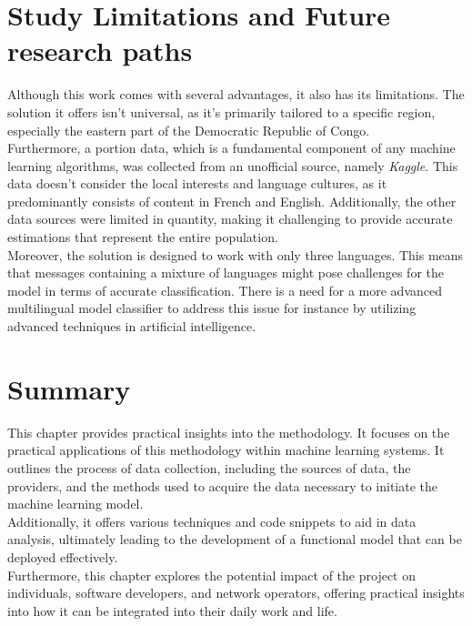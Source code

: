 \documentclass[12pt,a4paper, oneside]{book}
\begin{document}
\section{Study Limitations and Future research paths} 
Although this work comes with several advantages, it also has its limitations. The solution it offers isn't universal, as it's primarily tailored to a specific region, especially the eastern part of the Democratic Republic of Congo.\\

Furthermore, a portion data, which is a fundamental component of any machine learning algorithms, was collected from an unofficial source, namely \textit{Kaggle}. This data doesn't consider the local interests and language cultures, as it predominantly consists of content in French and English. Additionally, the other data sources were limited in quantity, making it challenging to provide accurate estimations that represent the entire population.\\

Moreover, the solution is designed to work with only three languages. This means that messages containing a mixture of languages might pose challenges for the model in terms of accurate classification. There is a need for a more advanced multilingual model classifier to address this issue for instance by utilizing advanced techniques in artificial intelligence.
 
\section{Summary}
This chapter provides practical insights into the methodology. It focuses on the practical applications of this methodology within machine learning systems. It outlines the process of data collection, including the sources of data, the providers, and the methods used to acquire the data necessary to initiate the machine learning model.\\

Additionally, it offers various techniques and code snippets to aid in data analysis, ultimately leading to the development of a functional model that can be deployed effectively.\\

Furthermore, this chapter explores the potential impact of the project on individuals, software developers, and network operators, offering practical insights into how it can be integrated into their daily work and life.\\
\end{document}
